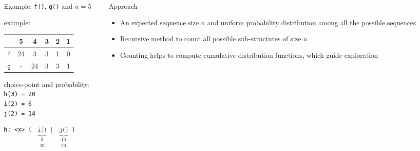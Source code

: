 \documentclass[9pt]{beamer}
\newcommand{\code}[1]{\texttt{#1}}
\begin{document}
\begin{frame}[t]
\begin{columns}[t]
\begin{column}{.6\textwidth}
\begin{exampleblock}{Example: \code{f()}, \code{g()} and $n = 5$}
\begin{overprint}
%
%
%
%
%

\footnotesize
example:
\begin{center}
\begin{tabular}{r|c|c|c|c|c|}
         &  5 &  4 & 3 & 2 & 1 \\
\hline
\code{f} & 24 &  3 & 3 & 1 & 0 \\
\hline
\code{g} &  - & 24 & 3 & 3 & 1 \\
\hline
\end{tabular}
\end{center}

choice-point and probability: \\
\code{h(3) = 20} \\
\code{i(2) = 6} \\
\code{j(2) = 14} \\
\begin{center}
\code{h: <x> ( }
$\underbrace{\code{i()}}_{\dfrac{6}{20}}$\code{ | }
$\underbrace{\code{j()}}_{\dfrac{14}{20}}$\code{ )}
\end{center}
\end{overprint}

\end{exampleblock}
\end{column}

\begin{column}{.4\textwidth}
\begin{block}{Approach}
\begin{itemize}
\item An expected sequence size $n$ and uniform probability distribution among
all the possible sequences
\item Recursive method to count all possible sub-structures of size $n$
\item Counting helps to compute cumulative distribution functions, which
guide exploration
\end{itemize}
\end{block}


\end{column}
\end{columns}
\end{frame}
\end{document}

